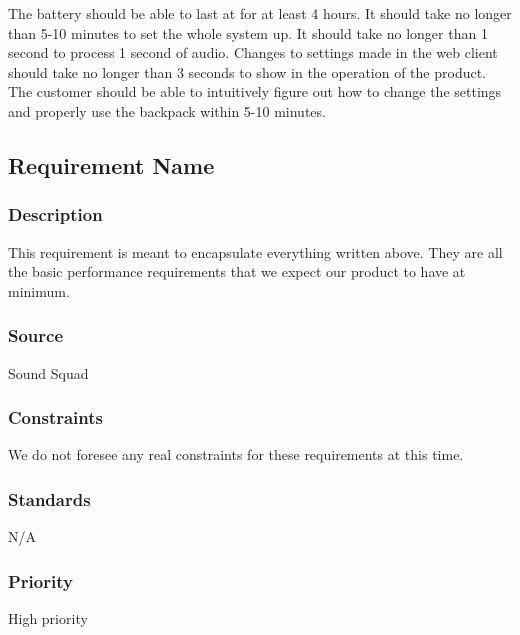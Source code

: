 The battery should be able to last at for at least 4 hours. It should take no longer than 5-10 minutes to set the whole system up. It should take no longer than 1 second to process 1 second of audio. Changes to settings made in the web client should take no longer than 3 seconds to show in the operation of the product. The customer should be able to intuitively figure out how to change the settings and properly use the backpack within 5-10 minutes.

\subsection{Requirement Name}
\subsubsection{Description}
This requirement is meant to encapsulate everything written above. They are all the basic performance requirements that we expect our product to have at minimum.
\subsubsection{Source}
Sound Squad
\subsubsection{Constraints}
We do not foresee any real constraints for these requirements at this time.
\subsubsection{Standards}
N/A
\subsubsection{Priority}
High priority